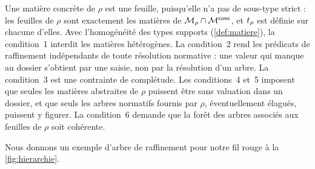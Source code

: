 \documentclass[review]{jflart}
\begin{document}
Une matière concrète de \(\rho\) est une feuille, puisqu'elle n'a pas de
sous-type strict : les feuilles de \(\rho\) sont exactement les matières de
\(\mathcal{M}_\rho\cap\mathcal{M}^{\mathsf{conc}}\), et \(t_\rho\) est définie sur chacune d'elles.
Avec l'homogénéité des types supports (\autoref{def:matiere}), la
condition~1 interdit les matières hétérogènes. La condition~2 rend les
prédicats de raffinement indépendants de toute résolution normative : une
valeur qui manque au dossier s'obtient par une saisie, non par la résolution
d'un arbre. La condition~3 est une contrainte de complétude. Les
conditions~4 et~5 imposent que seules les matières abstraites de $\rho$
puissent être sans valuation dans un dossier, et que seuls les arbres
normatifs fournis par $\rho$, éventuellement élagués, puissent y figurer. La
condition~6 demande que la forêt des arbres associés aux feuilles de $\rho$
soit cohérente.

Nous donnons un exemple d'arbre de raffinement pour notre fil rouge à la \autoref{fig:hierarchie}.
\end{document}
